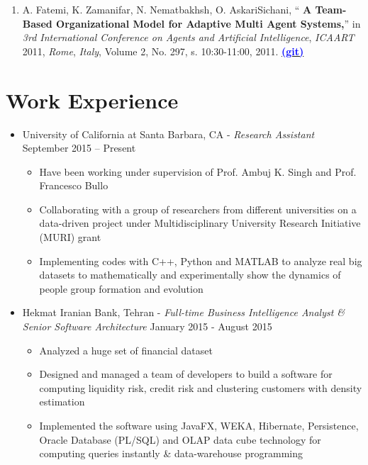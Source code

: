 \documentclass[letter]{res}
\begin{document}
\begin{resume}
\begin{enumerate}
\item A. Fatemi, K. Zamanifar, N. Nematbakhsh, O. AskariSichani, ``
\textbf{A Team-Based Organizational Model for Adaptive Multi Agent Systems,}''
in \textit{3rd International Conference on Agents and Artificial Intelligence},
\textit{ICAART} 2011, \textit{Rome}, \textit{Italy}, Volume 2, No. 297, s. 10:30-11:00, 2011.
{\href{https://github.com/omid55/team_based_rescue_jade_multi_agent_system}{\textbf{\textcolor{blue}{(git)}}}}

\end{enumerate}


\section{Work Experience}
\begin{itemize}
\item University of California at Santa Barbara, CA \newline
   - {\sl Research Assistant} \hfill September 2015 – Present\\
   \vspace{-4mm}
   \iflong
     \begin{itemize}
     \item Have been working under supervision of Prof. Ambuj K. Singh and Prof. Francesco Bullo
     \item Collaborating with a group of researchers from different universities on a data-driven project under Multidisciplinary University Research Initiative (MURI) grant
     \item Implementing codes with C++, Python and MATLAB to analyze real big datasets to mathematically and experimentally show the dynamics of people group formation and evolution
     \end{itemize}
   \fi 
   
  \item Hekmat Iranian Bank, Tehran \newline
   - {\sl Full-time Business Intelligence Analyst \& Senior Software Architecture} \hfill January 2015 - August 2015\\
  \vspace{-4mm}
  \iflong
    \begin{itemize}
        \item Analyzed a huge set of financial dataset
        \item Designed and managed a team of developers to build a software for computing liquidity risk, credit risk and clustering customers with density estimation
        \item Implemented the software using JavaFX, WEKA, Hibernate, Persistence, Oracle Database (PL/SQL) and OLAP data cube technology for computing queries instantly \& data-warehouse programming
    \end{itemize}
  \fi
  

\end{itemize}
\end{resume}
\end{document}
